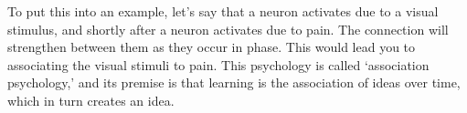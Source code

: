 To put this into an example, let's say that a \gls{neuron} activates due to a visual stimulus, and shortly after a \gls{neuron} activates due to pain. The connection will strengthen between them as they occur in phase.\cite[p.~63]{hebb} This would lead you to associating the visual stimuli to pain. This psychology is called ‘association psychology,’ and its premise is that learning is the association of ideas over time, which in turn creates an idea.\cite{learn}


